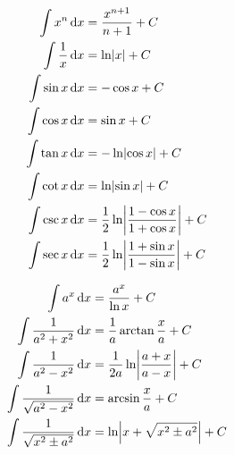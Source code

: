 \begin{multicols}{2}
\begin{equation*}
    \begin{aligned}
        \int x^n \dif x &= \frac{x^{n+1}}{n+1} + C \\
        \int \frac{1}{x} \dif x &= \ln \absolutevalue{x} + C \\
        \int \sin x \dif x &= -\cos x + C \\
        \int \cos x \dif x &= \sin x + C \\
        \int \tan x \dif x &= - \ln \absolutevalue{\cos x} + C \\
        \int \cot x \dif x &= \ln \absolutevalue{\sin x} + C \\
        \int \csc x \dif x &= \frac{1}{2} \ln \absolutevalue{\frac{1 - \cos x}{1 + \cos x}} + C \\
        \int \sec x \dif x &= \frac{1}{2} \ln \absolutevalue{\frac{1+\sin x}{1- \sin x}} + C \\      
    \end{aligned}
\end{equation*}

\begin{equation*}
    \begin{aligned}
        \int a^x \dif x &= \frac{a^x}{\ln x} + C \\
        \int \frac{1}{a^2 + x^2} \dif x &= \frac{1}{a} \arctan \frac{x}{a} + C \\
        \int \frac{1}{a^2 - x^2} \dif x &= \frac{1}{2a} \ln \absolutevalue{\frac{a+x}{a-x}} + C \\
        \int \frac{1}{\sqrt{a^2 - x^2}} \dif x &= \arcsin \frac{x}{a} + C \\
        \int \frac{1}{\sqrt{x^2 \pm a^2}} \dif x &= \ln \absolutevalue{x + \sqrt{x^2 \pm a^2}} + C \\         
    \end{aligned}
\end{equation*}

\end{multicols}

